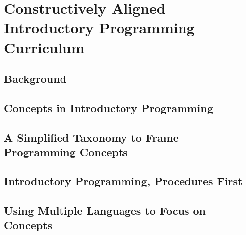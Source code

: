 
\chapter{Constructively Aligned Introductory Programming Curriculum} %
\label{cha:constructively_aligned_introductory_programming_curriculum}


\section{Background} %
\label{sec:background}



\section{Concepts in Introductory Programming} %
\label{sec:concepts_in_introductory_programming}


\section{A Simplified Taxonomy to Frame Programming Concepts} %
\label{sec:a_simplified_taxonomy_to_frame_programming_concepts}


\section{Introductory Programming, Procedures First} %
\label{sec:introductory_programming_procedures_first}


\section{Using Multiple Languages to Focus on Concepts} %
\label{sec:using_multiple_languages_to_focus_on_concepts}


